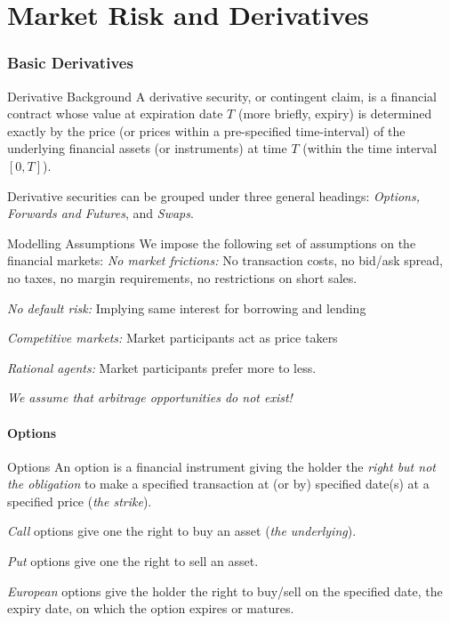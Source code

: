 \part{Market Risk and Derivatives}

\section{Basic Derivatives}
 
Derivative Background
	A derivative security, or contingent claim, is a financial
	contract whose value at expiration date $T$ (more briefly, expiry)
	is determined exactly  by the price (or
	prices within a pre-specified time-interval) of the underlying
	financial assets (or instruments) at time $T$ (within the time
	interval $[0,T]$).

	Derivative securities can be grouped under three general headings:
	{\it Options, Forwards and Futures}, and {\it Swaps}.


Modelling Assumptions
We impose the following set of assumptions on the financial markets:
	{\it No market frictions: } No transaction costs, no bid/ask spread, no taxes, no margin requirements, no restrictions on short sales.
 
	{\it No default risk:} Implying same interest for borrowing and lending
	
	{\it Competitive markets:}  Market participants act as price takers
	
	{\it Rational agents:} Market participants prefer more to less.
	
	\emph{We assume that arbitrage opportunities do not exist!}


\subsection{Options}
Options
	An option is a financial instrument giving the holder the {\it right but
	not the obligation} to make a specified transaction at (or by)
	specified date(s) at a specified price ({\it the strike}).

	{\it Call} options give one the right to buy an asset (\emph{the
	underlying}).

	{\it Put} options give one the right to sell an asset.
	
	{\it European} options give the holder the right
	to buy/sell on the specified date, the expiry date, on which the option expires
	or matures.
	
